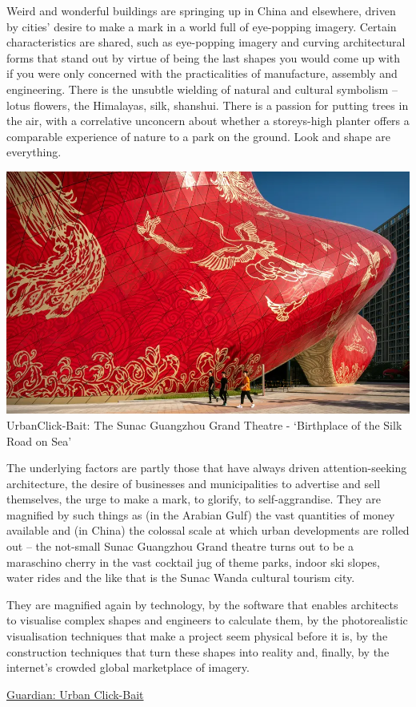 \documentclass[
]{book}
\begin{document}
Weird and wonderful buildings are springing up in China and elsewhere, driven by cities' desire to make a mark in a world full of eye-popping imagery.
Certain characteristics are shared, such as eye-popping imagery and curving architectural forms that stand out by virtue of being the last shapes you would come up with if you were only concerned with the practicalities of manufacture, assembly and engineering. There is the unsubtle wielding of natural and cultural symbolism -- lotus flowers, the Himalayas, silk, shanshui. There is a passion for putting trees in the air, with a correlative unconcern about whether a storeys-high planter offers a comparable experience of nature to a park on the ground. Look and shape are everything.

\includegraphics{fig/Sunac_Guangzhou_Grand_Theatre.png}
UrbanClick-Bait: The Sunac Guangzhou Grand Theatre - `Birthplace of the Silk Road on Sea'

The underlying factors are partly those that have always driven attention-seeking architecture, the desire of businesses and municipalities to advertise and sell themselves, the urge to make a mark, to glorify, to self-aggrandise. They are magnified by such things as (in the Arabian Gulf) the vast quantities of money available and (in China) the colossal scale at which urban developments are rolled out -- the not-small Sunac Guangzhou Grand theatre turns out to be a maraschino cherry in the vast cocktail jug of theme parks, indoor ski slopes, water rides and the like that is the Sunac Wanda cultural tourism city.

They are magnified again by technology, by the software that enables architects to visualise complex shapes and engineers to calculate them, by the photorealistic visualisation techniques that make a project seem physical before it is, by the construction techniques that turn these shapes into reality and, finally, by the internet's crowded global marketplace of imagery.

\href{https://www.theguardian.com/artanddesign/2021/jan/24/urban-clickbait-why-iconic-architecture-is-all-the-rage-again}{Guardian: Urban Click-Bait}

  
\end{document}
